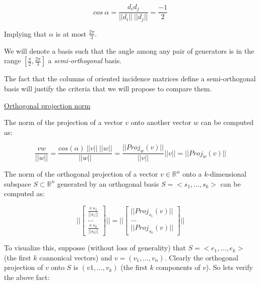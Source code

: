 \documentclass[a4paper,11pt]{article}
\begin{document}
$$cos \ \alpha = \frac{d_i d_j}{||d_i|| \ ||d_j||} = \frac{-1}{2}$$

\bigskip

Implying that $\alpha$ is at most $\frac{2\pi}{3}$.

\bigskip

We will denote a basis such that the angle among any pair of generators 
is in the range $[\frac{\pi}{2},\frac{2\pi}{3}]$ a \textit{semi-orthogonal} 
basis.

\bigskip

The fact that the columns of oriented incidence matrices define a 
semi-orthogonal basis will justify the criteria that we will propose to 
compare them. 

\bigskip

\underline{Orthogonal projection norm}

\bigskip
The norm of the projection of a vector $v$ onto another vector $w$ can 
be computed as:

$$\frac{v w}{||w||} = \frac{cos(\alpha) \ ||v|| \ ||w||}{||w||} = \frac{||Proj_w(v)||}{||v||} ||v|| = ||Proj_w(v)||$$

\bigskip

The norm of the orthogonal projection of a vector $v \in \mathbb{R}^n$ 
onto a $k$-dimensional subspace $S \subset \mathbb{R}^n$ generated by an 
orthogonal basis $S = <s_1, \dots, s_k>$ can be computed as:

$$
||\begin{bmatrix}
	\frac{v \ s_1}{||s_1||} \\
	\dots \\
	\frac{v \ s_k}{||s_k||}
\end{bmatrix}|| = 
||\begin{bmatrix}
	||Proj_{s_1}(v)|| \\
	\dots \\
	||Proj_{s_k}(v)||
\end{bmatrix}||
$$

\bigskip

To visualize this, supposse (without loss of generality) that $S = 
<e_1, \dots, e_k>$ (the first $k$ cannonical vectors) and $v = (v_1, 
\dots, v_n)$. Clearly the orthogonal projection of $v$ onto $S$ 
is $(v1, \dots, v_k)$ (the first $k$ components of $v$). So lets verify 
the above fact:
\end{document}
